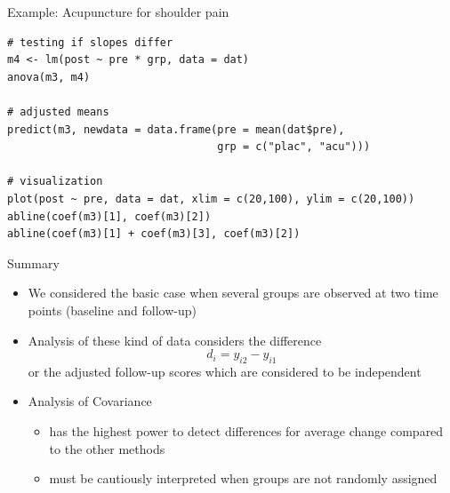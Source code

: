 \documentclass[aspectratio=169]{beamer}
\begin{document}
\begin{frame}[fragile]{Example: Acupuncture for shoulder pain}
\begin{lstlisting}
# testing if slopes differ
m4 <- lm(post ~ pre * grp, data = dat)
anova(m3, m4)

# adjusted means
predict(m3, newdata = data.frame(pre = mean(dat$pre),
                                 grp = c("plac", "acu")))

# visualization
plot(post ~ pre, data = dat, xlim = c(20,100), ylim = c(20,100))
abline(coef(m3)[1], coef(m3)[2])
abline(coef(m3)[1] + coef(m3)[3], coef(m3)[2])
\end{lstlisting}
\end{frame}

\begin{frame}{Summary}
\begin{itemize}
  \item We considered the basic case when several groups are observed at
    two time points (baseline and follow-up)
  \item Analysis of these kind of data considers the difference
    \[
        d_i = y_{i2} - y_{i1}
    \]
    or the adjusted follow-up scores which are considered to be independent
  \item Analysis of Covariance
  \begin{itemize}
    \item has the highest power to detect differences for average change
      compared to the other methods
    \item must be cautiously interpreted when groups are not randomly
      assigned
  \end{itemize}
\end{itemize}
\end{frame}
\end{document}

